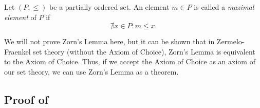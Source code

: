 \begin{definition}
	Let \((P, \leq)\) be a partially ordered set. An element \(m \in P\) is called a \emph{maximal element} of \(P\) if
	\begin{equation}
		\nexists x \in P: m \leq x.
	\end{equation}
\end{definition}
We will not prove Zorn's Lemma here, but it can be shown that in Zermelo-Fraenkel set theory (without the Axiom of Choice), Zorn's Lemma is equivalent to the Axiom of Choice. Thus, if we accept the Axiom of Choice as an axiom of our set theory, we can use Zorn's Lemma as a theorem.

\subsection[Proof of \nameref*{thm:module_basis}]{Proof of }

